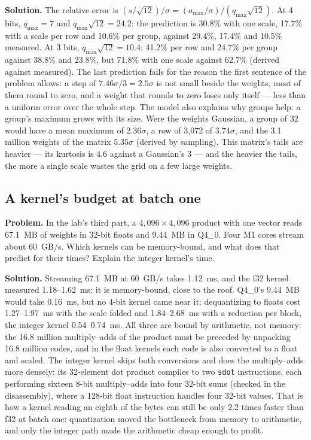 \textbf{Solution.} The relative error is
$(s/\sqrt{12})/\sigma = (a_{\max}/\sigma)/(q_{\max}\sqrt{12})$. At 4 bits,
$q_{\max} = 7$ and $q_{\max}\sqrt{12} = 24.2$: the prediction is 30.8\% with one
scale, 17.7\% with a scale per row and 10.6\% per group, against 29.4\%, 17.4\%
and 10.5\% measured. At 3 bits, $q_{\max}\sqrt{12} = 10.4$: 41.2\% per row and
24.7\% per group against 38.8\% and 23.8\%, but 71.8\% with one scale against
62.7\% (derived against measured). The last prediction fails for the reason the
first sentence of the problem allows: a step of $7.46\sigma/3 = 2.5\sigma$ is
not small beside the weights, most of them round to zero, and a weight that
rounds to zero loses only itself --- less than a uniform error over the whole
step. The model also explains why groups help: a group's maximum grows with its
size. Were the weights Gaussian, a group of 32 would have a mean maximum of
$2.36\sigma$, a row of 3,072 of $3.74\sigma$, and the 3.1 million weights of the
matrix $5.35\sigma$ (derived by sampling). This matrix's tails are heavier ---
its kurtosis is 4.6 against a Gaussian's 3 --- and the heavier the tails, the
more a single scale wastes the grid on a few large weights.

\subsection{A kernel's budget at batch one}
\textbf{Problem.} In the lab's third part, a $4{,}096 \times 4{,}096$ product with
one vector reads 67.1~MB of weights in 32-bit floats and 9.44~MB in Q4\_0. Four
M1 cores stream about 60~GB/s. Which kernels can be memory-bound, and what does
that predict for their times? Explain the integer kernel's time.

\textbf{Solution.} Streaming 67.1~MB at 60~GB/s takes 1.12~ms, and the f32 kernel
measured 1.18--1.62~ms: it is memory-bound, close to the roof. Q4\_0's 9.44~MB would
take 0.16~ms, but no 4-bit kernel came near it: dequantizing to floats cost
1.27--1.97~ms with the scale folded and 1.84--2.68~ms with a reduction per block, the
integer kernel 0.54--0.74~ms. All three are bound by arithmetic, not memory:
the 16.8 million multiply--adds of the product must be preceded by unpacking
16.8 million codes, and in the float kernels each code is also converted to a
float and scaled. The integer kernel skips both conversions and does the
multiply--adds more densely: its 32-element dot product compiles to two
\texttt{sdot} instructions, each performing sixteen 8-bit multiply--adds into four
32-bit sums (checked in the disassembly), where a 128-bit float instruction
handles four 32-bit values. That is
how a kernel reading an eighth of the bytes can still be only
2.2 times faster than f32 at batch one: quantization moved the bottleneck
from memory to arithmetic, and only the integer path made the arithmetic cheap
enough to profit.
